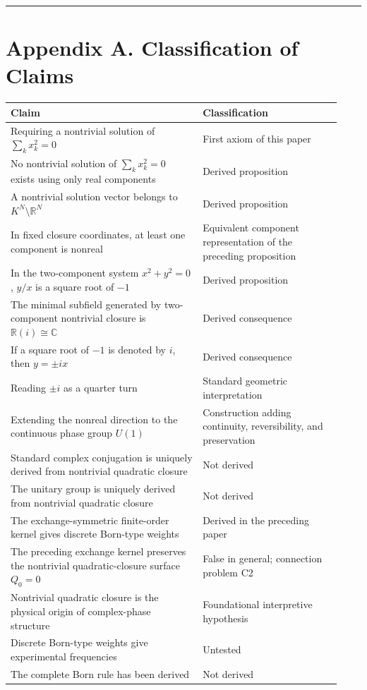 \documentclass[
  a4paper,
  10pt]{article}
\newcounter{none} %
\begin{document}
\begin{center}\rule{0.5\linewidth}{0.5pt}\end{center}

\section{Appendix A. Classification of
Claims}\label{appendix-a-classification-of-claims}

{\def\LTcaptype{none} %
\small
\begin{longtable}[]{@{}p{0.54\linewidth}p{0.39\linewidth}@{}}
\toprule\noalign{}
Claim & Classification \\
\midrule\noalign{}
\endhead
\bottomrule\noalign{}
\endlastfoot
Requiring a nontrivial solution of \(\sum_kx_k^2=0\) & First axiom of
this paper \\
No nontrivial solution of \(\sum_kx_k^2=0\) exists using only real
components & Derived proposition \\
A nontrivial solution vector belongs to \(K^N\setminus\mathbb R^N\) &
Derived proposition \\
In fixed closure coordinates, at least one component is nonreal &
Equivalent component representation of the preceding proposition \\
In the two-component system \(x^2+y^2=0\), \(y/x\) is a square root of
\(-1\) & Derived proposition \\
The minimal subfield generated by two-component nontrivial closure is
\(\mathbb R(i)\cong\mathbb C\) & Derived consequence \\
If a square root of \(-1\) is denoted by \(i\), then \(y=\pm ix\) &
Derived consequence \\
Reading \(\pm i\) as a quarter turn & Standard geometric
interpretation \\
Extending the nonreal direction to the continuous phase group \(U(1)\) &
Construction adding continuity, reversibility, and preservation \\
Standard complex conjugation is uniquely derived from nontrivial
quadratic closure & Not derived \\
The unitary group is uniquely derived from nontrivial quadratic closure
& Not derived \\
The exchange-symmetric finite-order kernel gives discrete Born-type
weights & Derived in the preceding paper \\
The preceding exchange kernel preserves the nontrivial quadratic-closure
surface \(Q_0=0\) & False in general; connection problem C2 \\
Nontrivial quadratic closure is the physical origin of complex-phase
structure & Foundational interpretive hypothesis \\
Discrete Born-type weights give experimental frequencies & Untested \\
The complete Born rule has been derived & Not derived \\
\end{longtable}
}
\end{document}

